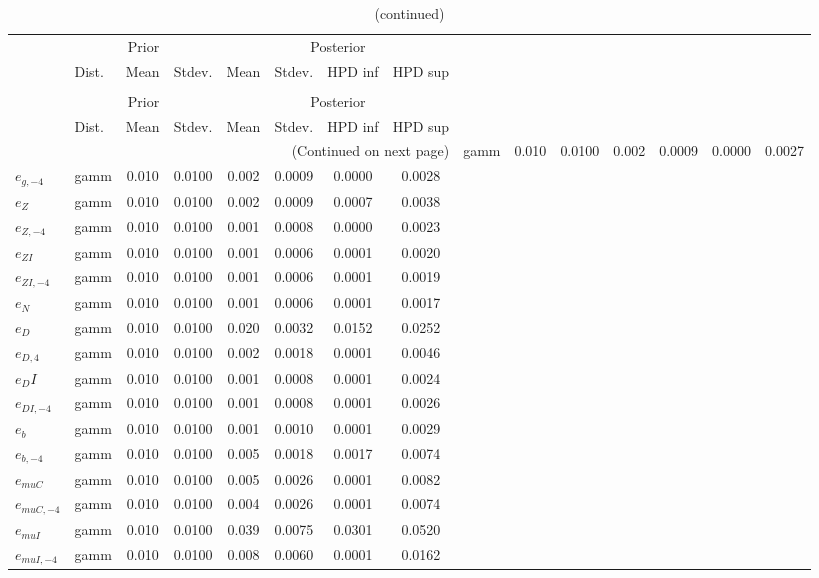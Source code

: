  
\begin{center}
\begin{longtable}{llcccccc} 
\caption{Results from Metropolis-Hastings (standard deviation of structural shocks)}
 \label{Table:MHPosterior:2}\\
\toprule 
  & \multicolumn{3}{c}{Prior}  &  \multicolumn{4}{c}{Posterior} \\
  \cmidrule(r{.75em}){2-4} \cmidrule(r{.75em}){5-8}
  & Dist. & Mean  & Stdev. & Mean & Stdev. & HPD inf & HPD sup\\
\midrule \endfirsthead 
\caption{(continued)}\\\toprule 
  & \multicolumn{3}{c}{Prior}  &  \multicolumn{4}{c}{Posterior} \\
  \cmidrule(r{.75em}){2-4} \cmidrule(r{.75em}){5-8}
  & Dist. & Mean  & Stdev. & Mean & Stdev. & HPD inf & HPD sup\\
\midrule \endhead 
\bottomrule \multicolumn{8}{r}{(Continued on next page)} \endfoot 
\bottomrule \endlastfoot 
${e_g}$ & gamm &   0.010 & 0.0100 &   0.002& 0.0009 &  0.0000 &  0.0027 \\ 
${e_{g,-4}}$ & gamm &   0.010 & 0.0100 &   0.002& 0.0009 &  0.0000 &  0.0028 \\ 
${e_Z}$ & gamm &   0.010 & 0.0100 &   0.002& 0.0009 &  0.0007 &  0.0038 \\ 
${e_{Z,-4}}$ & gamm &   0.010 & 0.0100 &   0.001& 0.0008 &  0.0000 &  0.0023 \\ 
${e_{ZI}}$ & gamm &   0.010 & 0.0100 &   0.001& 0.0006 &  0.0001 &  0.0020 \\ 
${e_{ZI,-4}}$ & gamm &   0.010 & 0.0100 &   0.001& 0.0006 &  0.0001 &  0.0019 \\ 
${e_N}$ & gamm &   0.010 & 0.0100 &   0.001& 0.0006 &  0.0001 &  0.0017 \\ 
${e_D}$ & gamm &   0.010 & 0.0100 &   0.020& 0.0032 &  0.0152 &  0.0252 \\ 
${e_{D,4}}$ & gamm &   0.010 & 0.0100 &   0.002& 0.0018 &  0.0001 &  0.0046 \\ 
${e_DI}$ & gamm &   0.010 & 0.0100 &   0.001& 0.0008 &  0.0001 &  0.0024 \\ 
${e_{DI,-4}}$ & gamm &   0.010 & 0.0100 &   0.001& 0.0008 &  0.0001 &  0.0026 \\ 
${e_b}$ & gamm &   0.010 & 0.0100 &   0.001& 0.0010 &  0.0001 &  0.0029 \\ 
${e_{b,-4}}$ & gamm &   0.010 & 0.0100 &   0.005& 0.0018 &  0.0017 &  0.0074 \\ 
${e_{muC}}$ & gamm &   0.010 & 0.0100 &   0.005& 0.0026 &  0.0001 &  0.0082 \\ 
${e_{muC,-4}}$ & gamm &   0.010 & 0.0100 &   0.004& 0.0026 &  0.0001 &  0.0074 \\ 
${e_{muI}}$ & gamm &   0.010 & 0.0100 &   0.039& 0.0075 &  0.0301 &  0.0520 \\ 
${e_{muI,-4}}$ & gamm &   0.010 & 0.0100 &   0.008& 0.0060 &  0.0001 &  0.0162 \\ 
\end{longtable}
 \end{center}
